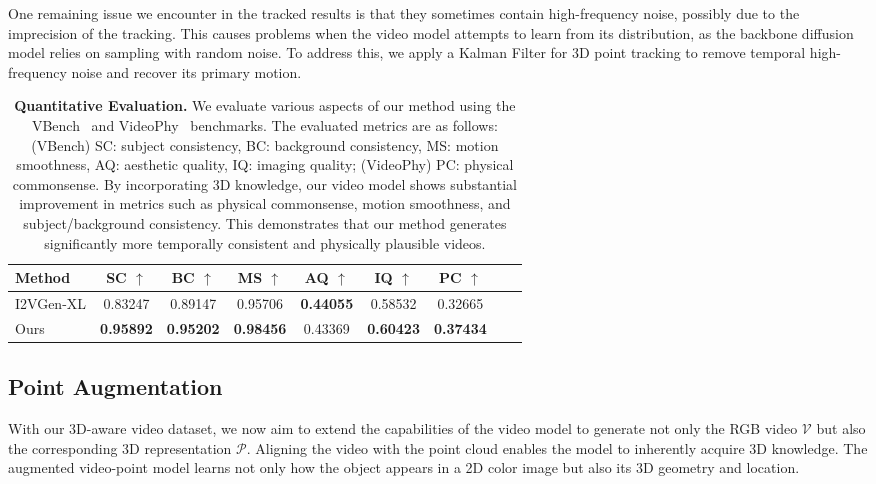 One remaining issue we encounter in the tracked results is that they sometimes contain high-frequency noise, possibly due to the imprecision of the tracking. This causes problems when the video model attempts to learn from its distribution, as the backbone diffusion model relies on sampling with random noise. To address this, we apply a Kalman Filter for 3D point tracking to remove temporal high-frequency noise and recover its primary motion.


\begin{table*}[t]
    \centering
    \caption{\textbf{Quantitative Evaluation.} We evaluate various aspects of our method using the VBench~\cite{huang2024vbench} and VideoPhy~\cite{bansal2024videophy} benchmarks. The evaluated metrics are as follows: (VBench) SC: subject consistency, BC: background consistency, MS: motion smoothness, AQ: aesthetic quality, IQ: imaging quality; (VideoPhy) PC: physical commonsense. By incorporating 3D knowledge, our video model shows substantial improvement in metrics such as physical commonsense, motion smoothness, and subject/background consistency. This demonstrates that our method generates significantly more temporally consistent and physically plausible videos.} 
    \begin{tabular}{lcccccccc}
        \toprule
        Method &
        SC $\uparrow$ & BC $\uparrow$ & MS $\uparrow$ & AQ $\uparrow$ & IQ $\uparrow$ & PC $\uparrow$ %
        \\\midrule
        I2VGen-XL & 0.83247 & 0.89147 & 0.95706 & \textbf{0.44055} & 0.58532 & 0.32665 \\
        Ours & \textbf{0.95892} & \textbf{0.95202} & \textbf{0.98456} & 0.43369 & \textbf{0.60423}  & \textbf{0.37434} \\
        \bottomrule
    \end{tabular}
    \label{tab:score}
\end{table*}

\subsection{Point Augmentation}\label{sec:method:training}
With our 3D-aware video dataset, we now aim to extend the capabilities of the video model to generate not only the RGB video $\mathcal{V}$ but also the corresponding 3D representation $\mathcal{P}$. Aligning the video with the point cloud enables the model to inherently acquire 3D knowledge. The augmented video-point model learns not only how the object appears in a 2D color image but also its 3D geometry and location.

